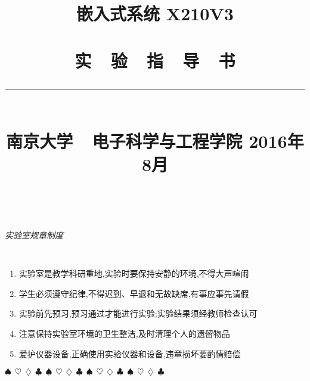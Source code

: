 \documentclass[a4paper,11pt]{book}
\title{
\begin{flushright}
\bf 嵌入式系统 X210V3 \\ \ \\
\textsf{实~~验~~指~~导~~书}\\
\rule[10pt]{.6\textwidth}{2pt}\\
\large \textsf{南京大学~~电子科学与工程学院}
\vskip 4cm 2016年8月
\end{flushright}
}
\author{}
\date{}
\begin{document}
\maketitle

\thispagestyle{empty} ~ \vskip 2cm
\begin{center} \LARGE \it \textsf{实验室规章制度} \end{center}
\large \tt
\begin{enumerate}\itemsep=-5pt
  \item 实验室是教学科研重地,实验时要保持安静的环境,不得大声喧闹
  \item 学生必须遵守纪律,不得迟到、早退和无故缺席,有事应事先请假
  \item 实验前先预习,预习通过才能进行实验;实验结果须经教师检查认可
  \item 注意保持实验室环境的卫生整洁,及时清理个人的遗留物品
  \item 爱护仪器设备,正确使用实验仪器和设备,违章损坏要酌情赔偿
\end{enumerate}

\vspace{4mm}\begin{center}
$\spadesuit~~ \heartsuit~~ \diamondsuit~~ \clubsuit~~
\spadesuit~~ \heartsuit~~ \diamondsuit~~ \clubsuit~~
\spadesuit~~ \heartsuit~~ \diamondsuit~~ \clubsuit~~
\spadesuit~~ \heartsuit~~ \diamondsuit~~ \clubsuit~~$
\end{center}\vspace{4mm}



\frontmatter
{}
\setlength{\parindent}{2em}
\setlength\doublerulesep{.2pt}

\baselineskip=17pt
\tableofcontents

\mainmatter

\let\oldchapter\chapter
\renewcommand{\chapter}[2]
{\oldchapter{#1}
   \addthumb{#1}{\bf #2}{white}{gray}
}


\pagestyle{headings}
\setcounter{page}{1}











\end{document}
